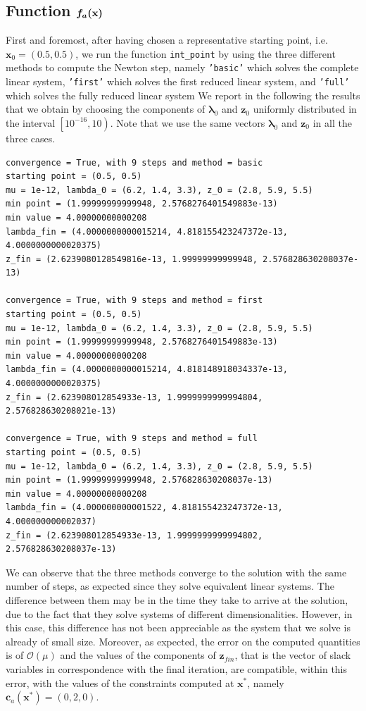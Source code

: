 \documentclass[a4paper,11pt]{article}
\begin{document}
\subsection*{Function $\boldmath{f_{a}}(\textbf{x})$}
First and foremost, after having chosen a representative starting point, i.e.~$\textbf{x}_{0}=(0.5,0.5)$, we run the function \texttt{int_point} by using the three different methods to compute the Newton step, namely \texttt{'basic'} which solves the complete linear system, \texttt{'first'} which solves the first reduced linear system, and \texttt{'full'}  which solves the fully reduced linear system  We report in the following the results that we obtain by choosing the components of $\boldsymbol{\lambda}_{0}$ and $\textbf{z}_{0}$ uniformly distributed in the interval $\left[10^{-16},10\right)$. Note that we use the same vectors $\boldsymbol{\lambda}_{0}$ and $\textbf{z}_{0}$ in all the three cases.
\begin{verbatim}
convergence = True, with 9 steps and method = basic
starting point = (0.5, 0.5)
mu = 1e-12, lambda_0 = (6.2, 1.4, 3.3), z_0 = (2.8, 5.9, 5.5)
min point = (1.99999999999948, 2.5768276401549883e-13)
min value = 4.00000000000208
lambda_fin = (4.0000000000015214, 4.818155423247372e-13, 4.0000000000020375)
z_fin = (2.6239080128549816e-13, 1.99999999999948, 2.576828630208037e-13)

convergence = True, with 9 steps and method = first
starting point = (0.5, 0.5)
mu = 1e-12, lambda_0 = (6.2, 1.4, 3.3), z_0 = (2.8, 5.9, 5.5)
min point = (1.99999999999948, 2.5768276401549883e-13)
min value = 4.00000000000208
lambda_fin = (4.0000000000015214, 4.818148918034337e-13, 4.0000000000020375)
z_fin = (2.623908012854933e-13, 1.9999999999994804, 2.576828630208021e-13)

convergence = True, with 9 steps and method = full
starting point = (0.5, 0.5)
mu = 1e-12, lambda_0 = (6.2, 1.4, 3.3), z_0 = (2.8, 5.9, 5.5)
min point = (1.99999999999948, 2.576828630208037e-13)
min value = 4.00000000000208
lambda_fin = (4.000000000001522, 4.818155423247372e-13, 4.000000000002037)
z_fin = (2.623908012854933e-13, 1.9999999999994802, 2.576828630208037e-13)
\end{verbatim}

\noindent We can observe that the three methods converge to the solution with the same number of steps, as expected since they solve equivalent linear systems. The difference between them may be in the time they take to arrive at the solution, due to the fact that they solve systems of different dimensionalities. However, in this case, this difference has not been appreciable as the system that we solve is already of small size. Moreover, as expected, the error on the computed quantities is of $\mathcal{O}(\mu)$ and the values of the components of $\textbf{z}_{fin}$, that is the vector of slack variables in correspondence with the final iteration, are compatible, within this error, with the values of the constraints computed at $\textbf{x}^{*}$, namely $\textbf{c}_{a}(\textbf{x}^{*})=(0,2,0)$.\\
\end{document}

